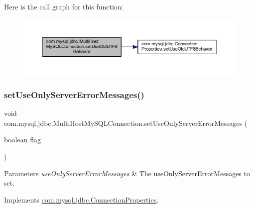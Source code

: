 Here is the call graph for this function\+:
\nopagebreak
\begin{figure}[H]
\begin{center}
\leavevmode
\includegraphics[width=350pt]{classcom_1_1mysql_1_1jdbc_1_1_multi_host_my_s_q_l_connection_abafab2c58d9f694f0b8d332f19d012f3_cgraph}
\end{center}
\end{figure}
\mbox{\label{classcom_1_1mysql_1_1jdbc_1_1_multi_host_my_s_q_l_connection_a64cd255943d0563c0246595083a5f2a7}} 
\subsubsection{\texorpdfstring{set\+Use\+Only\+Server\+Error\+Messages()}{setUseOnlyServerErrorMessages()}}
{\footnotesize\ttfamily void com.\+mysql.\+jdbc.\+Multi\+Host\+My\+S\+Q\+L\+Connection.\+set\+Use\+Only\+Server\+Error\+Messages (\begin{DoxyParamCaption}\item[{boolean}]{flag }\end{DoxyParamCaption})}


\begin{DoxyParams}{Parameters}
{\em use\+Only\+Server\+Error\+Messages} & The use\+Only\+Server\+Error\+Messages to set. \\
\hline
\end{DoxyParams}


Implements \mbox{\hyperlink{interfacecom_1_1mysql_1_1jdbc_1_1_connection_properties_a4d6983e3fcbf208b481c59edb1aa793b}{com.\+mysql.\+jdbc.\+Connection\+Properties}}.

